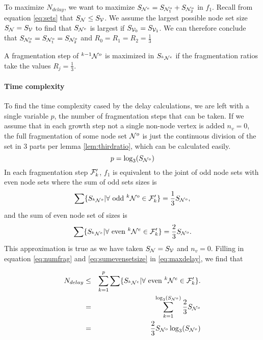 To maximize $N_{delay}$, we want to maximize $S_{\mathcal{N}^e} = S_{\mathcal{N}^o_1} + S_{\mathcal{N}^o_2}$ in $f_1$. Recall from equation \ref{eq:sets} that $S_{\mathcal{N}} \leq S_{\mathcal{V}}$. We assume the largest possible node set size $S_{\mathcal{N}} = S_{\mathcal{V}}$ to find that $ S_{\mathcal{N}^e} $ is largest if $S_{\mathcal{V}_0} = S_{\mathcal{V}_1}$. We can therefore conclude that $S_{\mathcal{N}^o_0} = S_{\mathcal{N}^o_1} = S_{\mathcal{N}^o_2}$ and $R_0 = R_1 = R_2 = \frac{1}{3}$

\begin{lemma}\label{lem:thirdratio}
  A fragmentation step of ${}^{k-1}\mathcal{N}^o$ is maximized in $S_{{}^{k}\mathcal{N}^e}$ if the fragmentation ratios take the values $R_j = \frac{1}{3}$.
\end{lemma}

\paragraph{Time complexity}

To find the time complexity cased by the delay calculations, we are left with a single variable $p$, the number of fragmentation steps that can be taken. If we assume that in each growth step not a single non-node vertex is added $n_v = 0$, the full fragmentation of some node set $\mathcal{N}^o$ is just the continuous division of the set in 3 parts per lemma \ref{lem:thirdratio}, which can be calculated easily.
\begin{equation}\label{eq:numfrag}
  p = \log_3(S_{\mathcal{N}^o})
\end{equation}
In each fragmentation step $\mathcal{F}'_k$, $f_1$ is equivalent to the joint of odd node sets with even node sets where the sum of odd sets sizes is
\begin{equation}\label{eq:sumoddsetsize}
  \sum \{ S_{{}^{k}\mathcal{N}^o} | \forall \mbox{ odd } {}^{k}\mathcal{N}^o \in \mathcal{F}'_k \} = \frac{1}{3}S_{\mathcal{N}^o},
\end{equation}
and the sum of even node set of sizes is
\begin{equation}\label{eq:sumevensetsize}
  \sum \{ S_{{}^{k}\mathcal{N}^e} | \forall \mbox{ even } {}^{k}\mathcal{N}^e \in \mathcal{F}'_k \} = \frac{2}{3}S_{\mathcal{N}^o}.
\end{equation}
This approximation is true as we have taken $S_{\mathcal{N}} = S_{\mathcal{V}}$ and $n_v=0$. Filling in equation \ref{eq:numfrag} and \ref{eq:sumevensetsize} in \ref{eq:maxdelay}, we find that

\begin{eqnarray}
\nonumber  N_{delay} &\leq& \sum_{k=1}^{p} \sum \{ S_{{}^{k}\mathcal{N}^e} | \forall \mbox{ even } {}^{k}\mathcal{N}^e \in \mathcal{F}'_k \}. \\
\nonumber   &=& \sum_{k=1}^{\log_3(S_{\mathcal{N}^o})} \frac{2}{3}S_{\mathcal{N}^o} \\
   &=& \frac{2}{3}S_{\mathcal{N}^o}\log_3(S_{\mathcal{N}^o})
\end{eqnarray}


